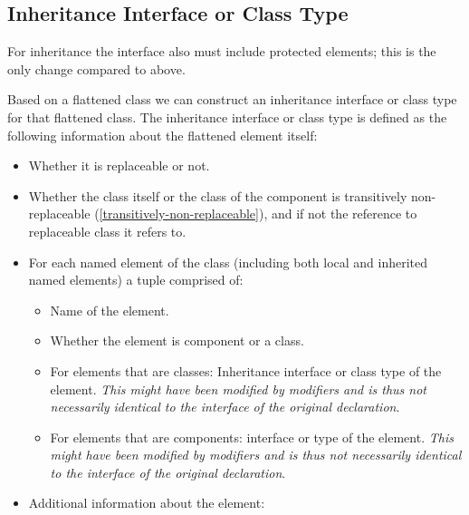 \documentclass[10pt,a4paper]{report}
\def\doublelabel#1{\label{#1}}
\begin{document}
\subsection{Inheritance Interface or Class Type}\doublelabel{inheritance-interface-or-class-type}

For inheritance the interface also must include protected elements; this
is the only change compared to above.

Based on a flattened class we can construct an inheritance interface or
class type for that flattened class. The inheritance interface or class
type is defined as the following information about the flattened element
itself:

\begin{itemize}
\item
  Whether it is replaceable or not.
\item
  Whether the class itself or the class of the component is transitively
  non-replaceable (\ref{transitively-non-replaceable}), and if not the reference to
  replaceable class it refers to.
\item
  For each named element of the class (including both local and
  inherited named elements) a tuple comprised of:

  \begin{itemize}
  \item
    Name of the element.
  \item
    Whether the element is component or a class.
  \item
    For elements that are classes: Inheritance interface or class type
    of the element. \emph{This might have been modified by modifiers and
    is thus not necessarily identical to the interface of the original
    declaration}.
  \item
    For elements that are components: interface or type of the element.
    \emph{This might have been modified by modifiers and is thus not
    necessarily identical to the interface of the original declaration}.
  \end{itemize}
\item
  Additional information about the element:


\end{itemize}
\end{document}
